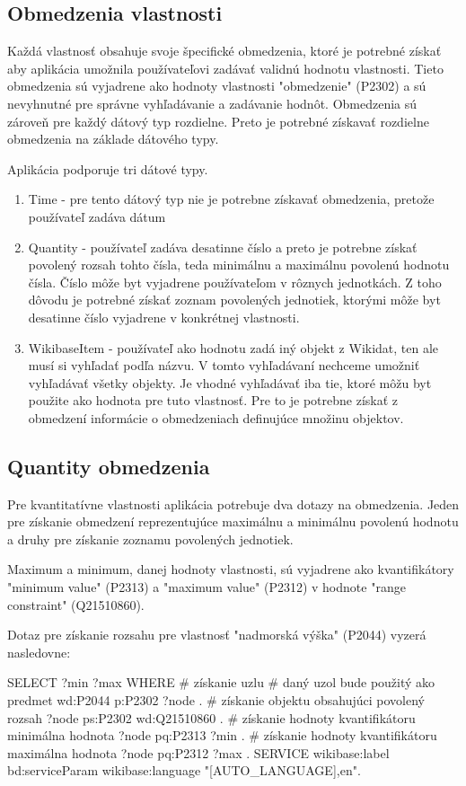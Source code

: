 \subsection{Obmedzenia vlastnosti }
Každá vlastnosť obsahuje svoje špecifické obmedzenia, ktoré je potrebné získať aby aplikácia umožnila
používateľovi zadávať validnú hodnotu vlastnosti. Tieto obmedzenia sú vyjadrene ako hodnoty vlastnosti "obmedzenie" (P2302) a sú
nevyhnutné pre správne vyhľadávanie a zadávanie hodnôt.
Obmedzenia sú zároveň pre každý dátový typ rozdielne. Preto je potrebné získavať rozdielne obmedzenia na základe dátového typy.

Aplikácia podporuje tri dátové typy.

\begin{enumerate}
      \item Time - pre tento dátový typ nie je potrebne získavať obmedzenia, pretože používateľ zadáva dátum
      \item Quantity - používateľ zadáva desatinne číslo a preto je potrebne získať povolený rozsah tohto čísla,
            teda minimálnu a maximálnu povolenú hodnotu čísla. Číslo môže byt vyjadrene používateľom v rôznych jednotkách.
            Z toho dôvodu je potrebné získať zoznam povolených jednotiek, ktorými môže byt desatinne číslo vyjadrene v konkrétnej vlastnosti.
      \item WikibaseItem - používateľ ako hodnotu zadá iný objekt z Wikidat, ten ale musí si vyhľadať podľa názvu. V tomto vyhľadávaní
            nechceme umožniť vyhľadávať všetky objekty. Je vhodné vyhľadávať iba tie, ktoré môžu byt použite ako hodnota pre tuto vlastnosť. Pre to je potrebne
            získať z obmedzení informácie o obmedzeniach definujúce množinu objektov.
\end{enumerate}

\subsection*{Quantity obmedzenia }
Pre kvantitatívne vlastnosti aplikácia potrebuje dva dotazy na obmedzenia. Jeden pre získanie obmedzení reprezentujúce maximálnu a minimálnu povolenú hodnotu
a druhy pre získanie zoznamu povolených jednotiek.

Maximum a minimum, danej hodnoty vlastnosti, sú
vyjadrene ako kvantifikátory "minimum value" (P2313)
a "maximum value" (P2312) v hodnote "range constraint" (Q21510860).

Dotaz pre získanie rozsahu pre vlastnosť "nadmorská výška" (P2044) vyzerá nasledovne:
\begin{code}
      SELECT  ?min ?max
      WHERE {
      # získanie uzlu
      # daný uzol bude použitý ako predmet
      wd:P2044 p:P2302 ?node .
      # získanie objektu obsahujúci povolený rozsah
      ?node ps:P2302 wd:Q21510860 .
      # získanie hodnoty kvantifikátoru minimálna hodnota
      ?node pq:P2313 ?min .
      # získanie hodnoty kvantifikátoru maximálna hodnota
      ?node pq:P2312 ?max .
      SERVICE wikibase:label {
      bd:serviceParam wikibase:language "[AUTO_LANGUAGE],en".
      }
      }
\end{code}

